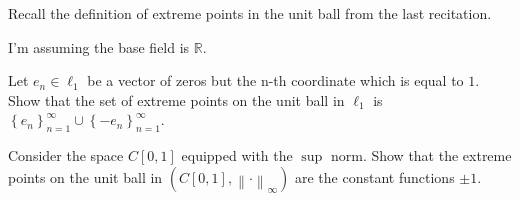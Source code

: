 \documentclass[11pt]{article} %
\newcommand{\norm}[1]{\left\lVert#1\right\rVert}
\begin{document}
\begin{Exercise}
Recall the definition of extreme points in the unit ball from the last recitation.

I'm assuming the base field is $\mathbb{R}$.
\begin{enumerate}
\begin{item}
Let $e_n \in \ell_1$ be a vector of zeros but the n-th coordinate which is equal to $1$. Show that the set of extreme points on the unit ball in $\ell_1$ is $\left\{e_n\right\}_{n=1}^\infty \cup \left\{-e_n\right\}_{n=1}^\infty$.
\end{item}
\begin{item}
Consider the space $C\left[0,1\right]$ equipped with the $\sup$ norm. Show that the extreme points on the unit ball in $\left( C\left[0,1\right], \norm{\cdot}_\infty\right)$ are the constant functions $\pm 1$.
\end{item}
\end{enumerate}
\end{Exercise}
\end{document}
